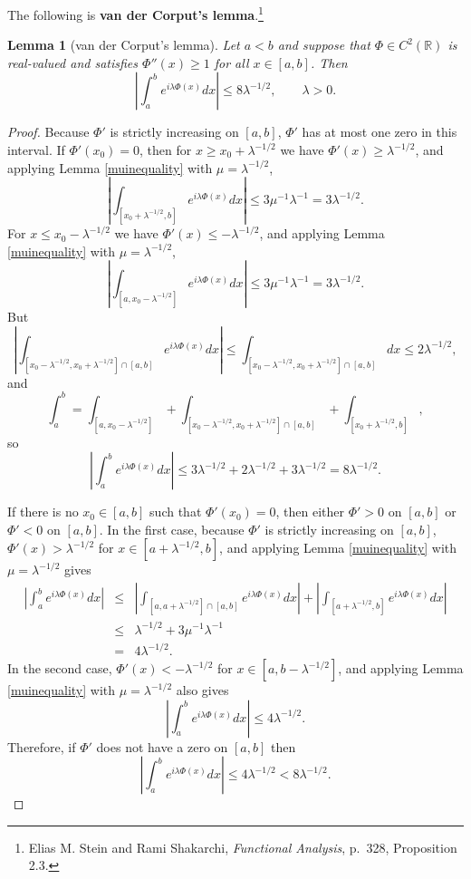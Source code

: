 \documentclass{article}
\newtheorem{lemma}[theorem]{Lemma}
\theoremstyle{definition}
\begin{document}
The following is \textbf{van der Corput's lemma}.\footnote{Elias M. Stein and Rami Shakarchi, {\em Functional Analysis}, p.~328, Proposition 2.3.}

\begin{lemma}[van der Corput's lemma]
Let $a<b$ and suppose that $\Phi \in C^2(\mathbb{R})$ is real-valued and satisfies $\Phi''(x) \geq 1$ for all $x \in [a,b]$.  Then
\[
\left| \int_a^b e^{i\lambda \Phi(x)} dx\right|  \leq 8 \lambda^{-1/2}, \qquad \lambda>0.
\]
\label{vandercorput}
\end{lemma}
\begin{proof}
Because $\Phi'$ is strictly increasing on $[a,b]$, $\Phi'$ has at most one zero in this interval.
If $\Phi'(x_0)=0$, then for $x \geq x_0+ \lambda^{-1/2}$ we have
$\Phi'(x) \geq \lambda^{-1/2}$, and  applying Lemma \ref{muinequality} with $\mu=\lambda^{-1/2}$,
\[
\left| \int_{[x_0+\lambda^{-1/2},b]} e^{i\lambda \Phi(x)} dx \right| \leq 3\mu^{-1} \lambda^{-1} = 3\lambda^{-1/2}.
\]
For $x \leq x_0-\lambda^{-1/2}$ we have $\Phi'(x) \leq - \lambda^{-1/2}$, and  applying Lemma \ref{muinequality} with $\mu=\lambda^{-1/2}$,
\[
\left| \int_{[a,x_0-\lambda^{-1/2}]} e^{i\lambda \Phi(x)} dx \right| \leq 3\mu^{-1} \lambda^{-1} = 3\lambda^{-1/2}.
\]
But
\[
\left| \int_{[x_0-\lambda^{-1/2},x_0+\lambda^{-1/2}] \cap [a,b]} e^{i\lambda \Phi(x)} dx \right| \leq  \int_{[x_0-\lambda^{-1/2},x_0+\lambda^{-1/2}] \cap [a,b]}  dx \leq
2\lambda^{-1/2},
\]
and
\[
\int_a^b = \int_{[a,x_0-\lambda^{-1/2}]} +  \int_{[x_0-\lambda^{-1/2},x_0+\lambda^{-1/2}] \cap [a,b]} +  \int_{[x_0+\lambda^{-1/2},b]},
\]
so 
\[
\left| \int_a^b e^{i\lambda \Phi(x)} dx\right| \leq 3\lambda^{-1/2}+2\lambda^{-1/2}+3\lambda^{-1/2}= 8\lambda^{-1/2}.
\]

If there is no $x_0 \in [a,b]$ such that $\Phi'(x_0)=0$, then either $\Phi'>0$ on $[a,b]$ or $\Phi'<0$ on $[a,b]$. In the first case, 
because $\Phi'$ is strictly increasing on $[a,b]$, $\Phi'(x) > \lambda^{-1/2}$ for 
$x \in [a+\lambda^{-1/2},b]$, and applying Lemma \ref{muinequality} with $\mu=\lambda^{-1/2}$ gives
\begin{eqnarray*}
\left| \int_a^b e^{i\lambda \Phi(x)} dx \right| 
&\leq& \left| \int_{[a,a+\lambda^{-1/2}] \cap [a,b]} e^{i\lambda \Phi(x)} dx \right|
+\left| \int_{[a+\lambda^{-1/2},b]} e^{i\lambda \Phi(x)} dx \right|\\
&\leq&\lambda^{-1/2} + 3\mu^{-1} \lambda^{-1}\\
&=&4\lambda^{-1/2}.
\end{eqnarray*}
In the second case, $\Phi'(x) < -\lambda^{-1/2}$ for $x \in [a,b-\lambda^{-1/2}]$, and applying Lemma
\ref{muinequality} with $\mu=\lambda^{-1/2}$ also gives
\[
\left| \int_a^b e^{i\lambda \Phi(x)} dx \right|  \leq 4 \lambda^{-1/2}.
\]
Therefore, if $\Phi'$ does not have a zero on $[a,b]$ then
\[
\left| \int_a^b e^{i\lambda \Phi(x)} dx \right|  \leq 4 \lambda^{-1/2} < 8\lambda^{-1/2}.
\]
\end{proof}
\end{document}
